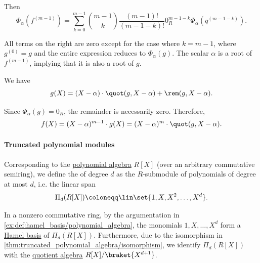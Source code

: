 \begin{defproof}
  Then
  \begin{equation*}
    \Phi_\alpha(f^{(m-1)}) = \sum_{k=0}^{m-1} \binom {m-1} k \frac {(m - 1)!} {(m - 1 - k)!} 0_R^{m - 1 - k} \Phi_\alpha(q^{(m - 1 - k)}).
  \end{equation*}

  All terms on the right are zero except for the case where \( k = m - 1 \), where \( g^{(0)} = g \) and the entire expression reduces to \( \Phi_\alpha(g) \). The scalar \( \alpha \) is a root of \( f^{(m-1)} \), implying that it is also a root of \( g \).

  We have
  \begin{equation*}
    g(X) = (X - \alpha) \cdot \quot(g, X - \alpha) + \rem(g, X - \alpha).
  \end{equation*}

  Since \( \Phi_\alpha(g) = 0_R \), the remainder is necessarily zero. Therefore,
  \begin{equation*}
    f(X) = (X - \alpha)^{m-1} \cdot g(X) = (X - \alpha)^m \cdot \quot(g, X - \alpha).
  \end{equation*}
\end{defproof}

\paragraph{Truncated polynomial modules}

\begin{definition}\label{def:truncated_polynomial_algebra}\mimprovised
  Corresponding to the \hyperref[def:polynomial_algebra]{polynomial algebra} \( R[X] \) (over an arbitrary commutative semiring), we define the  of degree \( d \) as the \( R \)-submodule of polynomials of degree at most \( d \), i.e. the linear span
  \begin{equation*}
    \Pi_d(R[X]) \coloneqq \lin\set{ 1, X, X^2, \ldots, X^d }.
  \end{equation*}

  In a nonzero commutative ring, by the argumentation in \cref{ex:def:hamel_basis/polynomial_algebra}, the monomials \( 1, X, \ldots, X^d \) form a \hyperref[def:hamel_basis]{Hamel basis} of \( \Pi_d(R[X]) \). Furthermore, due to the isomorphism in \cref{thm:truncated_polynomial_algebra/isomorphism}, we identify \( \Pi_d(R[X]) \) with the \hyperref[def:algebra_over_ring/quotient]{quotient algebra} \( R[X] / \braket{ X^{d+1} } \).
\end{definition}

